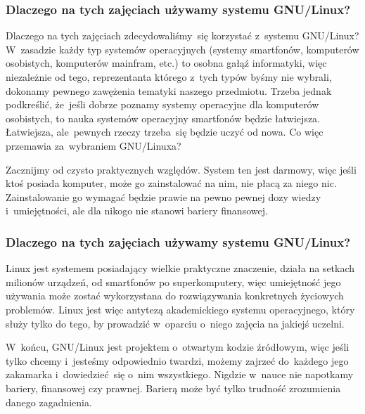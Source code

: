 \documentclass[10pt,t]{beamer}
\begin{document}
\begin{frame}
  \frametitle{Dlaczego na tych zajęciach używamy systemu
    GNU/Linux?}


  Dlaczego na tych zajęciach zdecydowaliśmy~się korzystać z~systemu
  GNU/Linux? W~zasadzie każdy typ systemów operacyjnych (systemy
  smartfonów, komputerów osobistych, komputerów mainfram, etc.) to osobna
  gałąź informatyki, więc niezależnie od tego, reprezentanta którego
  z~tych typów byśmy nie wybrali, dokonamy pewnego zawężenia tematyki
  naszego przedmiotu. Trzeba jednak podkreślić, że~jeśli dobrze poznamy
  systemy operacyjne dla komputerów osobistych, to nauka systemów
  operacyjny smartfonów będzie łatwiejsza. Łatwiejsza, ale~pewnych rzeczy
  trzeba~się będzie uczyć od nowa. Co więc przemawia za~wybraniem
  GNU/Linuxa?

  Zacznijmy od czysto praktycznych względów. System ten jest darmowy, więc
  jeśli ktoś posiada komputer, może go zainstalować na nim, nie płacą za
  niego nic. Zainstalowanie go wymagać będzie prawie na pewno pewnej
  dozy wiedzy i~umiejętności, ale dla nikogo nie stanowi bariery finansowej.

\end{frame}





\begin{frame}
  \frametitle{Dlaczego na tych zajęciach używamy systemu
    GNU/Linux?}


  Linux jest systemem posiadający wielkie praktyczne znaczenie, działa
  na setkach milionów urządzeń, od smartfonów po superkomputery, więc
  umiejętność jego używania może zostać wykorzystana do rozwiązywania
  konkretnych życiowych problemów. Linux jest więc antytezą akademickiego
  systemu operacyjnego, który służy tylko do tego, by prowadzić w~oparciu
  o~niego zajęcia na jakiejś uczelni.

  W~końcu, GNU/Linux jest projektem o~otwartym kodzie źródłowym, więc jeśli
  tylko chcemy i~jesteśmy odpowiednio twardzi, możemy zajrzeć do~każdego
  jego zakamarka i~dowiedzieć~się o~nim \alert{wszystkiego}. Nigdzie
  w~nauce nie napotkamy bariery, finansowej czy prawnej. Barierą
  może być tylko trudność zrozumienia danego zagadnienia.

\end{frame}
\end{document}

